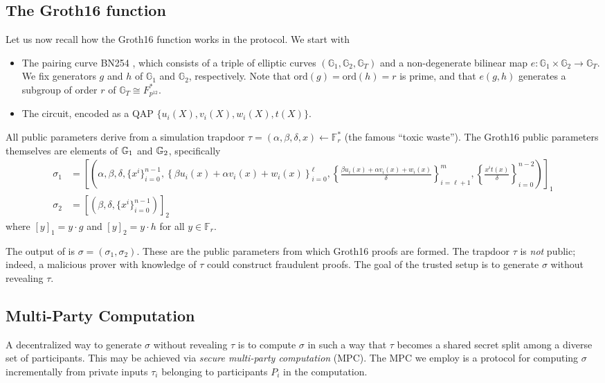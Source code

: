 \subsection{The Groth16 \Setup{} function}
Let us now recall how the Groth16 \Setup{} function works in the \MantaPay{} protocol. We start with 
\begin{itemize}
\item The pairing curve BN254 \cite{BN254}, which consists of a triple of elliptic curves $(\mathbb{G}_1, \mathbb{G}_2,\mathbb{G}_T) $ and a non-degenerate bilinear map $e: \mathbb{G}_1 \times \mathbb{G}_2 \to \mathbb{G}_T$. We fix generators $g$ and $h$ of $\mathbb{G}_1$ and $\mathbb{G}_2$, respectively. Note that $\textrm{ord}(g) = \textrm{ord}(h) = r$ is prime, and that $e(g,h)$ generates a subgroup of order $r$ of $\mathbb{G}_T \cong F_{p^{12}}^*$.
\item The \MantaPay{} circuit, encoded as a QAP $\{u_i(X), v_i(X), w_i(X), t(X)\}$.
\end{itemize}
All public parameters derive from a simulation trapdoor $\tau = (\alpha, \beta, \delta, x) \leftarrow \mathbb{F}_r^*$ (the famous ``toxic waste''). The Groth16 public parameters themselves are elements of $\mathbb{G}_1$ and $\mathbb{G}_2$, specifically
\begin{align*}
\sigma_1 &= \left[ \left(\alpha, \beta, \delta, \{ x^i \}_{i=0}^{n-1},\left\{  \beta u_i(x) + \alpha v_i(x) + w_i(x) \right\}_{i=0}^\ell, \left\{  \frac{\beta u_i(x) + \alpha v_i(x) + w_i(x)}{\delta} \right\}_{i=\ell+1}^m, \left\{ \frac{x^i t(x)}{\delta} \right\}_{i=0}^{n-2} \right) \right]_1 \\
\sigma_2 &= \left[ \left( \beta, \delta,  \{ x^i \}_{i=0}^{n-1} \right) \right]_2
\end{align*} 
where $[y]_1 = y \cdot g$ and $[y]_2 = y \cdot h$ for all $y \in \mathbb{F}_r$. 

The output of \Setup{} is $\sigma = (\sigma_1, \sigma_2)$. These are the public parameters from which Groth16 proofs are formed. The trapdoor $\tau$ is \emph{not} public; indeed, a malicious prover with knowledge of $\tau$ could construct fraudulent proofs. The goal of the trusted setup is to generate $\sigma$ without revealing $\tau$.

\subsection{Multi-Party Computation}
A decentralized way to generate $\sigma$ without revealing $\tau$ is to compute $\sigma$ in such a way that $\tau$ becomes a shared secret split among a diverse set of participants. This may be achieved via \emph{secure multi-party computation} (MPC). The MPC we employ is a protocol for computing $\sigma$ incrementally from private inputs $\tau_i$ belonging to participants $P_i$ in the computation. 

